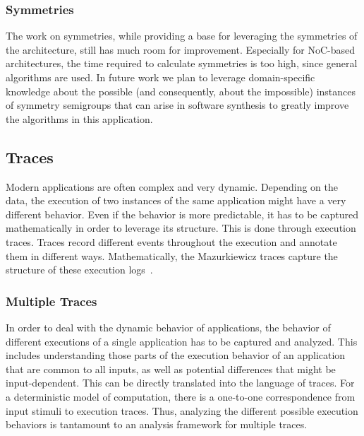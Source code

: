 \documentclass[sigplan,10pt]{acmart}
\begin{document}
\subsubsection{Symmetries}
The work on symmetries, while providing a base for leveraging the symmetries of the architecture, still has much room for improvement. Especially for NoC-based architectures, the time required to calculate symmetries is too high, since general algorithms are used.
In future work we plan to leverage domain-specific knowledge about the possible (and consequently, about the impossible) instances of symmetry semigroups that can arise in software synthesis to greatly improve the algorithms in this application.

\subsection{Traces}
Modern applications are often complex and very dynamic.
Depending on the data, the execution of two instances of the same application might have a very different behavior.
Even if the behavior is more predictable, it has to be captured mathematically in order to leverage its structure.
This is done through execution traces. Traces record different events throughout the execution and annotate them in different ways. Mathematically, the Mazurkiewicz traces capture the structure of these execution logs~\cite{bookoftraces}.

\subsubsection{Multiple Traces}
In order to deal with the dynamic behavior of applications, the behavior of different executions of a single application has to be captured and analyzed.
This includes understanding those parts of the execution behavior of an application that are common to all inputs, as well as potential differences that might be input-dependent.
This can be directly translated into the language of traces.
For a deterministic model of computation, there is a one-to-one correspondence from input stimuli to execution traces.
Thus, analyzing the different possible execution behaviors is tantamount to an analysis framework for multiple traces.
\end{document}
